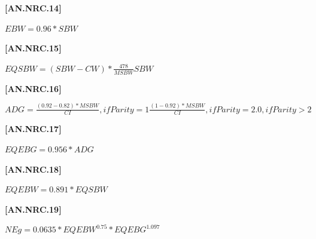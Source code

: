 \begin{refsection}
\begin{itemize}
\vspace{0.5cm}
            {\raggedleft \textbf{[AN.NRC.14]}\par}
\vspace{0.25cm}

\begin{center}
    \(EBW = 0.96 * SBW\)
\end{center}
\vspace{0.5cm}

            {\raggedleft \textbf{[AN.NRC.15]}\par}
\vspace{0.25cm}

\begin{center}
    \(EQSBW = (SBW - CW) *\frac{478}{MSBW} SBW\)
\end{center}
\vspace{0.5cm}

            {\raggedleft \textbf{[AN.NRC.16]}\par}
\vspace{0.25cm}

\begin{center}
    \(ADG = \frac{(0.92 - 0.82) * MSBW}{CI}, if Parity = 1 \frac{(1 - 0.92) * MSBW}{CI}, if Parity = 2.0, if Parity > 2\)
\end{center}
\vspace{0.5cm}

            {\raggedleft \textbf{[AN.NRC.17]}\par}
\vspace{0.25cm}

\begin{center}
    \(EQEBG = 0.956 * ADG\)
\end{center}
\vspace{0.5cm}

            {\raggedleft \textbf{[AN.NRC.18]}\par}
    \vspace{0.25cm}
    
\begin{center}
    \(EQEBW = 0.891 * EQSBW\)
\end{center}

\vspace{0.5cm}
            {\raggedleft \textbf{[AN.NRC.19]}\par}
\vspace{0.25cm}

\begin{center}
    \(NEg = 0.0635 * EQEBW^{0.75} * EQEBG^{1.097}\)
\end{center}


\end{itemize}
\end{refsection}
